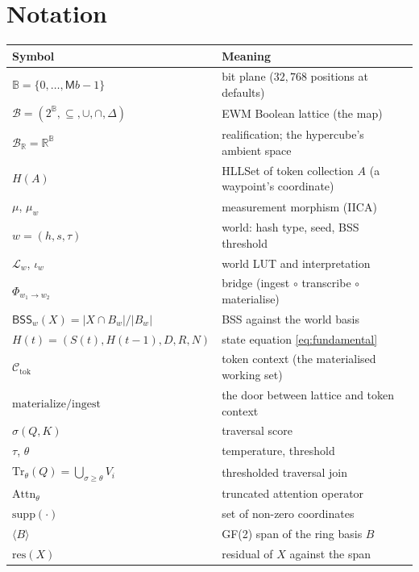 \documentclass[11pt,a4paper]{article}
\theoremstyle{remark}
\newcommand{\Plane}{\ensuremath{\mathbb{B}}}          %
\newcommand{\Lat}{\ensuremath{\mathcal{B}}}            %
\newcommand{\LatR}{\ensuremath{\mathcal{B}_{\mathbb{R}}}} %
\newcommand{\HLL}{\ensuremath{H}}                      %
\newcommand{\xor}{\ensuremath{\Delta}}                 %
\newcommand{\Reg}{\ensuremath{\mathsf{M}}}             %
\newcommand{\Bits}{\ensuremath{b}}                     %
\newcommand{\BSS}{\ensuremath{\mathsf{BSS}}}           %
\newcommand{\res}{\ensuremath{\mathrm{res}}}           %
\newcommand{\spanof}[1]{\ensuremath{\langle #1\rangle}}%
\newcommand{\supp}{\ensuremath{\mathrm{supp}}}         %
\newcommand{\Attn}{\ensuremath{\mathrm{Attn}}}          %
\newcommand{\Trv}{\ensuremath{\mathrm{Tr}}}             %
\newcommand{\World}{\ensuremath{w}}                     %
\newcommand{\Ctx}{\ensuremath{\mathcal{C}}}             %
\newcommand{\Lut}{\ensuremath{\mathcal{L}}}             %
\newcommand{\iotaw}{\ensuremath{\iota_{w}}}             %
\newcommand{\Bnd}{\ensuremath{\Phi}}                    %
\newcommand{\sigm}{\ensuremath{\sigma}}                 %
\begin{document}
\section{Notation}

\begin{center}
\small
\begin{tabular}{@{}ll@{}}
\toprule
\textbf{Symbol} & \textbf{Meaning} \\
\midrule
$\Plane=\{0,\dots,\Reg\Bits-1\}$ & bit plane ($32{,}768$ positions at defaults) \\
$\Lat=(2^{\Plane},\subseteq,\cup,\cap,\xor)$ & EWM Boolean lattice (the map) \\
$\LatR=\mathbb{R}^{\Plane}$ & realification; the hypercube's ambient space \\
$\HLL(A)$ & HLLSet of token collection $A$ (a waypoint's coordinate) \\
$\mu$, $\mu_\World$ & measurement morphism (IICA) \\
$\World=(h,s,\tau)$ & world: hash type, seed, BSS threshold \\
$\Lut_\World$, $\iotaw$ & world LUT and interpretation \\
$\Bnd_{\World_1\to\World_2}$ & bridge (ingest $\circ$ transcribe $\circ$ materialise) \\
$\BSS_\World(X)=|X\cap B_\World|/|B_\World|$ & BSS against the world basis \\
$H(t)=(S(t),H(t{-}1),D,R,N)$ & state equation \eqref{eq:fundamental} \\
$\Ctx_{\mathrm{tok}}$ & token context (the materialised working set) \\
$\mathrm{materialize}/\mathrm{ingest}$ & the door between lattice and token context \\
$\sigm(Q,K)$ & traversal score \\
$\tau$, $\theta$ & temperature, threshold \\
$\Trv_\theta(Q)=\bigcup_{\sigm\ge\theta}V_i$ & thresholded traversal join \\
$\Attn_\theta$ & truncated attention operator \\
$\supp(\cdot)$ & set of non-zero coordinates \\
$\spanof{B}$ & GF(2) span of the ring basis $B$ \\
$\res(X)$ & residual of $X$ against the span \\
\bottomrule
\end{tabular}
\end{center}
\end{document}
